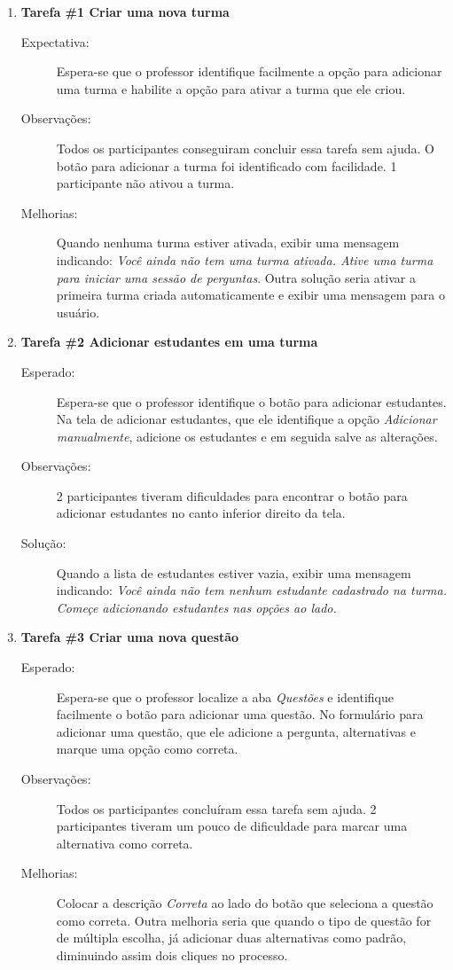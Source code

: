\begin{enumerate}[label={},leftmargin=*]
  \item \textbf{Tarefa \#1 Criar uma nova turma}
  \begin{description}
    \item [Expectativa:] Espera-se que o professor identifique facilmente a opção para adicionar uma turma e habilite
    a opção para ativar a turma que ele criou.
    \item [Observações:] Todos os participantes conseguiram concluir essa tarefa sem ajuda. O botão
    para adicionar a turma foi identificado com facilidade. 1 participante não ativou a turma.
    \item [Melhorias:] Quando nenhuma turma estiver ativada, exibir uma mensagem indicando:
    \textit{Você ainda não tem uma turma ativada. Ative uma turma para iniciar uma sessão de perguntas}.
    Outra solução seria ativar a primeira turma criada automaticamente e exibir uma mensagem para o usuário.
  \end{description}

  \item \textbf{Tarefa \#2 Adicionar estudantes em uma turma}
  \begin{description}
    \item [Esperado:] Espera-se que o professor identifique o botão para adicionar estudantes. Na tela de adicionar
    estudantes, que ele identifique a opção \textit{Adicionar manualmente}, adicione os estudantes e em seguida
    salve as alterações.
    \item [Observações:] 2 participantes tiveram dificuldades para encontrar o botão para
    adicionar estudantes no canto inferior direito da tela.
    \item [Solução:] Quando a lista de estudantes estiver vazia, exibir uma mensagem indicando:
    \textit{Você ainda não tem nenhum estudante cadastrado na turma. Começe adicionando estudantes nas opções ao lado.}
  \end{description}

  \item \textbf{Tarefa \#3 Criar uma nova questão}
  \begin{description}
    \item [Esperado:] Espera-se que o professor localize a aba \textit{Questões} e identifique facilmente
    o botão para adicionar uma questão. No formulário para adicionar uma questão, que ele
    adicione a pergunta, alternativas e marque uma opção como correta.
    \item[Observações:] Todos os participantes concluíram essa tarefa sem ajuda. 2 participantes
    tiveram um pouco de dificuldade para marcar uma alternativa como correta.
    \item[Melhorias:]
    Colocar a descrição \textit{Correta} ao lado do botão que seleciona a questão como correta.
    Outra melhoria seria que quando o tipo de questão for de múltipla escolha, já adicionar
    duas alternativas como padrão, diminuindo assim dois cliques no processo.
  \end{description}


\end{enumerate}
